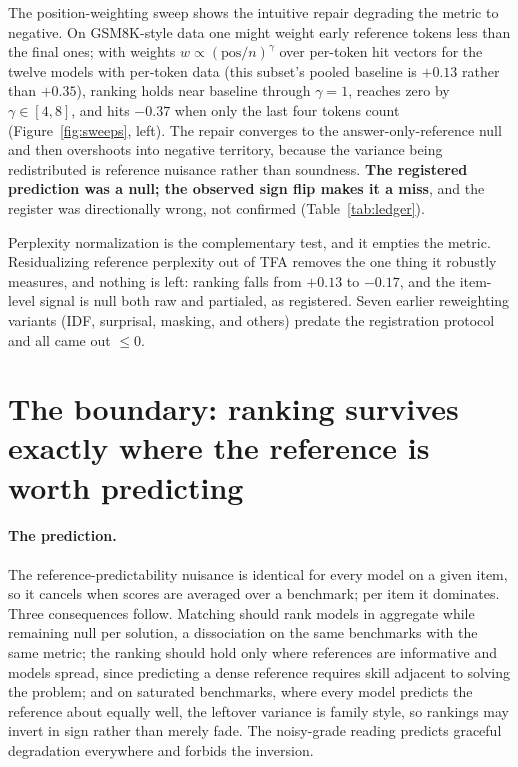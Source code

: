 \documentclass[11pt]{article}
\newcommand{\tfa}{\textsc{TFA}}
\begin{document}
The position-weighting sweep shows the intuitive repair degrading the metric to negative.
On \textsc{GSM8K}-style data one might weight early reference tokens less than the final ones; with weights $w \propto (\mathrm{pos}/n)^{\gamma}$ over per-token hit vectors for the twelve models with per-token data (this subset's pooled baseline is $+0.13$ rather than $+0.35$), ranking holds near baseline through $\gamma{=}1$, reaches zero by $\gamma \in [4,8]$, and hits $-0.37$ when only the last four tokens count (Figure~\ref{fig:sweeps}, left).
The repair converges to the answer-only-reference null and then overshoots into negative territory, because the variance being redistributed is reference nuisance rather than soundness.
\textbf{The registered prediction was a null; the observed sign flip makes it a miss}, and the register was directionally wrong, not confirmed (Table~\ref{tab:ledger}).

Perplexity normalization is the complementary test, and it empties the metric.
Residualizing reference perplexity out of \tfa{} removes the one thing it robustly measures, and nothing is left: ranking falls from $+0.13$ to $-0.17$, and the item-level signal is null both raw and partialed, as registered.
Seven earlier reweighting variants (IDF, surprisal, masking, and others) predate the registration protocol and all came out $\le 0$.

\section{The boundary: ranking survives exactly where the reference is worth predicting}
\label{sec:p3}

\paragraph{The prediction.}
The reference-predictability nuisance is identical for every model on a given item, so it cancels when scores are averaged over a benchmark; per item it dominates.
Three consequences follow.
Matching should rank models in aggregate while remaining null per solution, a dissociation on the same benchmarks with the same metric; the ranking should hold only where references are informative and models spread, since predicting a dense reference requires skill adjacent to solving the problem; and on saturated benchmarks, where every model predicts the reference about equally well, the leftover variance is family style, so rankings may invert in sign rather than merely fade.
The noisy-grade reading predicts graceful degradation everywhere and forbids the inversion.
\end{document}

